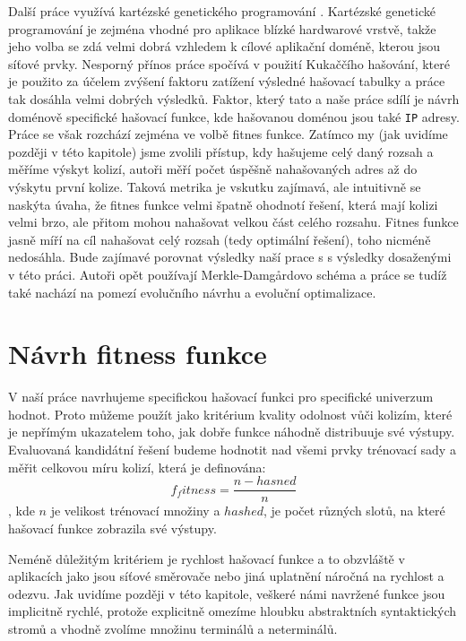 Další práce využívá kartézské genetického programování \cite{dobai0}.
Kartézské genetické programování je zejména vhodné pro aplikace blízké
hardwarové vrstvě, takže jeho volba se zdá velmi dobrá vzhledem k cílové aplikační doméně,
kterou jsou síťové prvky. Nesporný přínos práce spočívá v použití Kukaččího hašování, které
je použito za účelem zvýšení faktoru zatížení výsledné hašovací tabulky a práce tak dosáhla velmi
dobrých výsledků. Faktor, který tato a naše práce sdílí je návrh doménově specifické hašovací 
funkce, kde hašovanou doménou jsou také \texttt{IP} adresy. Práce se však rozchází zejména ve volbě 
fitnes funkce. Zatímco my (jak uvidíme později v této kapitole) jsme zvolili přístup, kdy hašujeme
celý daný rozsah a měříme výskyt kolizí, autoři měří počet úspěšně nahašovaných adres až do výskytu
první kolize. Taková metrika je vskutku zajímavá, ale intuitivně se naskýta úvaha, že fitnes funkce
velmi špatně ohodnotí řešení, která mají kolizi velmi brzo, ale přitom mohou nahašovat velkou část
celého rozsahu. Fitnes funkce jasně míří na cíl nahašovat celý rozsah (tedy optimální řešení), toho
nicméně nedosáhla. Bude zajímavé porovnat výsledky naší prace s s výsledky dosaženými v této
práci. Autoři opět používají Merkle-Damg\r{a}rdovo schéma a práce se tudíž také nachází na 
pomezí evolučního návrhu a evoluční optimalizace.

\section{Návrh fitness funkce}

V naší práce navrhujeme specifickou
hašovací funkci pro specifické univerzum hodnot. Proto můžeme použít jako kritérium
kvality odolnost vůči kolizím, které je nepřímým ukazatelem toho, jak dobře funkce
náhodně distribuuje své výstupy. Evaluovaná kandidátní řešení
budeme hodnotit nad všemi prvky trénovací sady a měřit celkovou míru kolizí, která je definována:
$$f_fitness = \frac{n - hasned}{n}$$,
kde $n$ je velikost trénovací množiny a $hashed$, je počet různých slotů, na které hašovací
funkce zobrazila své výstupy.  

Neméně důležitým kritériem je rychlost hašovací funkce a to obzvláště v aplikacích jako jsou
síťové směrovače nebo jiná uplatnění náročná na rychlost a odezvu. Jak uvidíme později v této
kapitole, veškeré námi navržené funkce jsou implicitně rychlé, protože explicitně omezíme hloubku
abstraktních syntaktických stromů a vhodně zvolíme množinu terminálů a neterminálů. 


